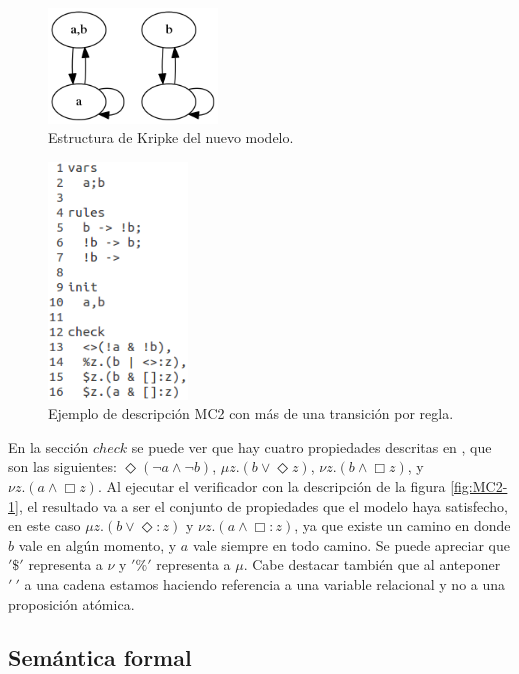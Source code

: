 \begin{figure}[H]
  \centering
  \includegraphics[width=0.4\textwidth]{Figures/kripke5.png}
  \caption{Estructura de Kripke del nuevo modelo.}
  \label{fig:kripke5}
\end{figure}

\begin{figure}[H]
  \centering
  \includegraphics[width=0.33\textwidth]{Figures/modeloMC2-3.png}
  \caption{Ejemplo de descripción MC2 con más de una transición por regla.}
  \label{fig:MC2-3}
\end{figure}

\noindent En la sección $check$ se puede ver que hay cuatro propiedades descritas en {\mucalculo}, que son las siguientes: $\Diamond (\neg a \land \neg b)$, $\mu z. (b \lor \Diamond z)$, $\nu z. (b \land \Box z)$, y $\nu z. (a \land \Box z)$. Al ejecutar el verificador con la descripción de la figura \ref{fig:MC2-1}, el resultado va a ser el conjunto de propiedades que el modelo haya satisfecho, en este caso $\mu z. (b \lor \Diamond : z)$ y $\nu z. (a \land \Box : z)$, ya que existe un camino en donde $b$ vale en algún momento, y $a$ vale siempre en todo camino. Se puede apreciar que $'\$'$ representa a $\nu$ y $'\%'$ representa a $\mu$. Cabe destacar también que al anteponer $'\:'$ a una cadena estamos haciendo referencia a una variable relacional y no a una proposición atómica.

\subsection{Semántica formal}

